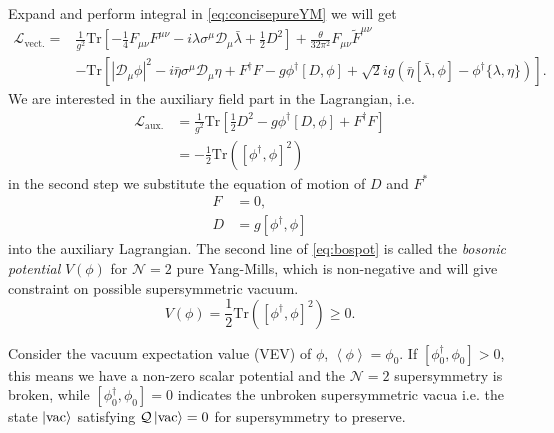 \documentclass{article}
\begin{document}
Expand and perform integral in \eqref{eq:concisepureYM} we will get
\begin{equation}
\begin{aligned}
\mathcal{L}_{\mathrm{vect.}}=& \frac{1}{g^{2}} \mathrm{Tr}\left[-\frac{1}{4} F_{\mu \nu} F^{\mu \nu}-i \lambda \sigma^{\mu} \mathcal{D}_{\mu} \bar{\lambda}+\frac{1}{2}D^2\right]+\frac{\theta}{32 \pi^{2}} F_{\mu \nu} \tilde{F}^{\mu \nu}\\
&-\mathrm{Tr}\left[|\mathcal{D}_\mu\phi|^2-i\bar{\eta}\sigma^{\mu} \mathcal{D}_{\mu}\eta+F^\dagger F-g\phi^\dagger [D,\phi]+\sqrt{2}ig\left(\bar{\eta}[\bar{\lambda},\phi]-\phi^\dagger\{\lambda,\eta\}\right)\right].
\end{aligned}
\end{equation}
We are interested in the auxiliary field part in the Lagrangian, i.e.
\begin{equation}
\begin{aligned}
\label{eq:bospot}
\mathcal{L}_{\mathrm{aux.}}&=\frac{1}{g^{2}} \mathrm{Tr}\left[\frac{1}{2}D^2-g\phi^\dagger[D,\phi]+F^\dagger F\right]\\
&=-\frac{1}{2} \mathrm{Tr}\left([\phi^\dagger,\phi]^2\right)
\end{aligned}
\end{equation}
in the second step we substitute the equation of motion of $D$ and $F^*$ 
\begin{align}
\label{eq:aux1}
F&=0,\\
\label{eq:aux2}
D&=g[\phi^\dagger,\phi]
\end{align}
into the auxiliary Lagrangian. The second line of \eqref{eq:bospot} is called the \textit{bosonic potential} $V(\phi)$ for $\mathcal{N}=2$ pure Yang-Mills, which is non-negative and will give constraint on possible supersymmetric vacuum.
\begin{equation}
V(\phi)=\frac{1}{2} \mathrm{Tr}\left([\phi^\dagger,\phi]^2\right)\geq 0.
\end{equation}

Consider the vacuum expectation value (VEV) of $\phi$, $\left<\phi\right>=\phi_0$. If $[\phi_0^\dagger,\phi_0]>0$, this means we have a non-zero scalar potential and the $\mathcal{N}=2$ supersymmetry is broken, while $[\phi_0^\dagger,\phi_0]=0$ indicates the unbroken supersymmetric vacua i.e. the state $\ket{\mathrm{vac}}$ satisfying $\mathcal{Q}\ket{\mathrm{vac}}=0$ for supersymmetry to preserve. 
\end{document}
